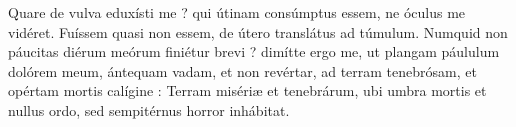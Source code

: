 
Quare de vulva eduxísti me ? qui útinam consúmptus essem, ne óculus me vidéret.
Fuíssem quasi non essem, de útero translátus ad túmulum.
Numquid non páucitas diérum meórum finiétur brevi ? dimítte ergo me, ut plangam páululum dolórem meum,
ántequam vadam, et non revértar, ad terram tenebrósam, et opértam mortis calígine :
Terram misériæ et tenebrárum, ubi umbra mortis et nullus ordo, sed sempitérnus horror inhábitat.